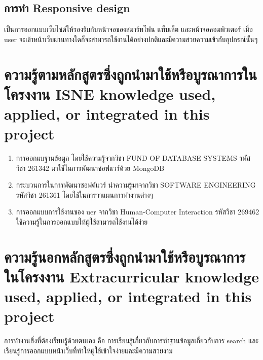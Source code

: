 \subsection{การทำ Responsive design}
เป็นการออกแบบเว็บไซต์ให้รองรับกับหน้าจอของสมาร์ทโฟน แท็บเล็ต และหน้าจอคอมพิวเตอร์ เมื่อ user จะเข้าหน้าเว็บผ่านทางใดก็จะสามารถใช้งานได้อย่างปกติและมีความสวยความเข้ากับอุปกรณ์นั้นๆ 

\section{\ifcpe%
ความรู้ตามหลักสูตรซึ่งถูกนำมาใช้หรือบูรณาการในโครงงาน
\else%
ISNE knowledge used, applied, or integrated in this project
\fi
}
\begin{enumerate}
    \item การออกแบฐานข้อมูล โดยใช้ความรู้จากวิชา FUND OF DATABASE SYSTEMS รหัส
วิชา 261342 มาใช้ในการพัฒนาซอฟแวร์ด้วย MongoDB
    \item กระบวนการในการพัฒนาซอฟต์แวร์ นำความรู้มาจากวิชา SOFTWARE
ENGINEERING รหัสวิชา 261361 โดยใช้ในการวาแผนการทำงานต่างๆ
    \item การออกแบบการใช้งานของ uer จากวิชา Human-Computer Interaction รหัสวิชา 269462 ใช้ความรู้ในการออกแบบให้ผู้ใช้สามารถใช้งานได้ง่าย
\end{enumerate}

\section{\ifcpe%
ความรู้นอกหลักสูตรซึ่งถูกนำมาใช้หรือบูรณาการในโครงงาน
\else%
Extracurricular knowledge used, applied, or integrated in this project
\fi
}

การทำงานสิ่งที่ต้องเรียนรู้ด้วยตนเอง คือ การเรียนรู้เกี่ยวกับการทำฐานข้อมูลเกี่ยวกับการ search และเรียนรู้การออกแบบหน้าเว็บที่ทำให้ผู้ใช้เข้าใจง่ายและมีความสวยงาม 
